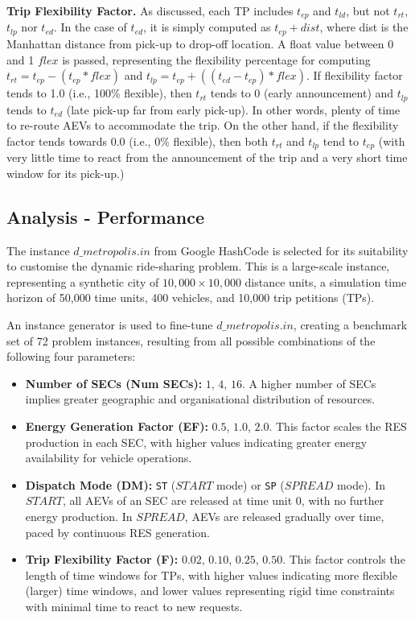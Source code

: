 \textbf{Trip Flexibility Factor.} As discussed, each TP includes $t_{ep}$ and $t_{ld}$, but not $t_{rt}$, $t_{lp}$ nor $t_{ed}$.  In the case of $t_{ed}$, it is simply computed as $t_{ep} + dist$, where dist is the Manhattan distance from pick-up to drop-off location.  A float value between 0 and 1 $flex$ is passed, representing the flexibility percentage for computing $t_{rt} = t_{ep} - (t_{ep}* flex)$ and $t_{lp} = t_{ep} + ((t_{ed} - t_{ep})* flex)$.  If flexibility factor tends to 1.0 (i.e., 100\% flexible), then $t_{rt}$ tends to 0 (early announcement) and $t_{lp}$ tends to $t_{ed}$ (late pick-up far from early pick-up).  In other words, plenty of time to re-route AEVs to accommodate the trip.  On the other hand, if the flexibility factor tends towards 0.0 (i.e., 0\% flexible), then both $t_{rt}$ and $t_{lp}$ tend to $t_{ep}$ (with very little time to react from the announcement of the trip and a very short time window for its pick-up.) 

\subsection{Analysis - Performance}
\label{analysis_performance}

The instance $d\_metropolis.in$ from Google HashCode is selected for its suitability to customise the dynamic ride-sharing problem. This is a large-scale instance, representing a synthetic city of $10,000 \times 10,000$ distance units, a simulation time horizon of 50,000 time units, 400 vehicles, and 10,000 trip petitions (TPs). 

An instance generator is used to fine-tune $d\_metropolis.in$, creating a benchmark set of 72 problem instances, resulting from all possible combinations of the following four parameters:

\begin{itemize}
    \item \textbf{Number of SECs (Num SECs):} $1$, $4$, $16$. A higher number of SECs implies greater geographic and organisational distribution of resources.
    \item \textbf{Energy Generation Factor (EF):} $0.5$, $1.0$, $2.0$. This factor scales the RES production in each SEC, with higher values indicating greater energy availability for vehicle operations.
    \item \textbf{Dispatch Mode (DM):} \texttt{ST} ($START$ mode) or \texttt{SP} ($SPREAD$ mode). In $START$, all AEVs of an SEC are released at time unit $0$, with no further energy production. In $SPREAD$, AEVs are released gradually over time, paced by continuous RES generation.
    \item \textbf{Trip Flexibility Factor (F):} $0.02$, $0.10$, $0.25$, $0.50$. This factor controls the length of time windows for TPs, with higher values indicating more flexible (larger) time windows, and lower values representing rigid time constraints with minimal time to react to new requests.
\end{itemize}

